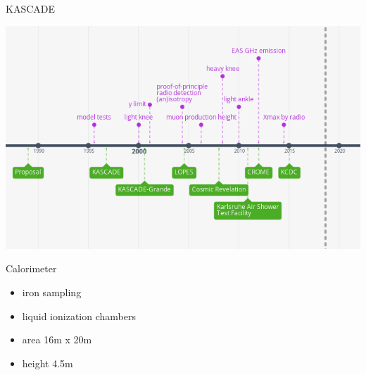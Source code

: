 \documentclass[18pt]{beamer}
\begin{document}
\begin{frame}{KASCADE}
\footnotesize
\begin{minipage}{0.69\textwidth}
  \includegraphics[width=1\textwidth,height=0.45\textheight]{pics/timeline_kascade.png}
\end{minipage}
\hfill
\begin{minipage}{0.29\textwidth}
  \begin{block}{Calorimeter}
    \begin{itemize}
      \setlength{\itemsep}{0pt}
      \item iron sampling
      \item liquid ionization chambers
      \item area 16m x 20m
      \item height 4.5m
    \end{itemize}
  \end{block}
\end{minipage}


\end{frame}
\end{document}
